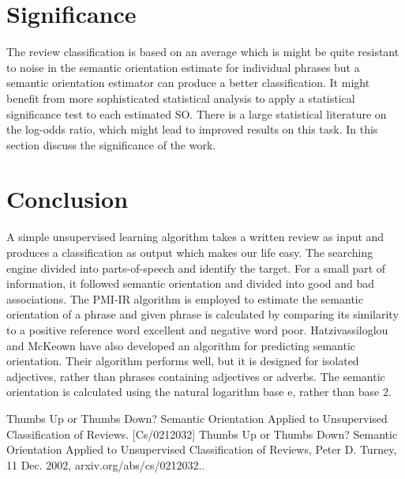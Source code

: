 \documentclass[journal, a4paper]{IEEEtran}
\begin{document}
\section{Significance}

	The review classification is based on an average which is might be quite resistant to noise in the semantic orientation estimate for individual phrases but a semantic orientation estimator can produce a better classification. It might benefit from more sophisticated statistical analysis to apply a statistical significance test to each estimated SO. There is a large statistical literature on the log-odds ratio, which might lead to improved results on this task. In this section discuss the significance of the work.
\section{Conclusion}
	A simple unsupervised learning algorithm takes a written review as input and produces a classification as output which makes our life easy. The searching engine divided into parts-of-speech and identify the target. For a small part of information, it followed semantic orientation and divided into good and bad associations. The PMI-IR algorithm is employed to estimate the semantic orientation of a phrase and given phrase is calculated by comparing its similarity to a positive reference word excellent and negative word poor. Hatzivassiloglou and McKeown have also developed an algorithm for predicting semantic orientation. Their algorithm performs well, but it is designed for isolated adjectives, rather than phrases containing adjectives or adverbs. The semantic orientation is calculated using the natural logarithm base e, rather than base 2.


\begin{thebibliography}{5}

Thumbs Up or Thumbs Down? Semantic Orientation Applied to Unsupervised Classification of Reviews. [Cs/0212032] Thumbs Up or Thumbs Down? Semantic Orientation Applied to Unsupervised Classification of Reviews, Peter D. Turney, 11 Dec. 2002, arxiv.org/abs/cs/0212032..


\end{thebibliography}
\end{document}
